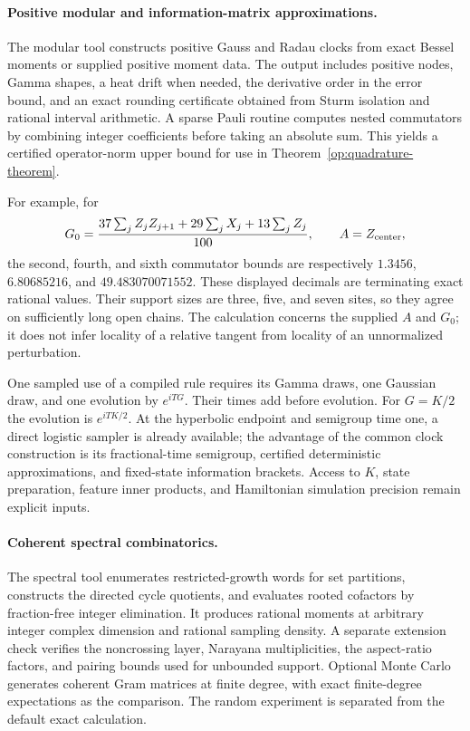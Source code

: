 \paragraph{Positive modular and information-matrix approximations.}
The modular tool constructs positive Gauss and Radau clocks from exact
Bessel moments or supplied positive moment data. The output includes
positive nodes, Gamma shapes, a heat drift when needed, the derivative
order in the error bound, and an exact rounding certificate obtained from
Sturm isolation and rational interval arithmetic. A sparse Pauli routine
computes nested commutators by combining integer coefficients before
taking an absolute sum. This yields a certified operator-norm upper bound
for use in Theorem~\ref{op:quadrature-theorem}.

For example, for
\[
 G_0=\frac{37\sum_jZ_jZ_{j+1}+29\sum_jX_j+13\sum_jZ_j}{100},
 \qquad A=Z_{\rm center},
\]
the second, fourth, and sixth commutator bounds are respectively
$1.3456$, $6.80685216$, and $49.483070071552$. These displayed decimals
are terminating exact rational values. Their support sizes are three,
five, and seven sites, so they agree on sufficiently long open chains.
The calculation concerns the supplied $A$ and $G_0$; it does not infer
locality of a relative tangent from locality of an unnormalized perturbation.

One sampled use of a compiled rule requires its Gamma draws, one Gaussian
draw, and one evolution by $e^{iTG}$. Their times add before evolution.
For $G=K/2$ the evolution is $e^{iTK/2}$. At the hyperbolic endpoint and
semigroup time one, a direct logistic sampler is already available; the
advantage of the common clock construction is its fractional-time
semigroup, certified deterministic approximations, and fixed-state
information brackets. Access to $K$, state preparation, feature inner
products, and Hamiltonian simulation precision remain explicit inputs.

\paragraph{Coherent spectral combinatorics.}
The spectral tool enumerates restricted-growth words for set partitions,
constructs the directed cycle quotients, and evaluates rooted cofactors by
fraction-free integer elimination. It produces rational moments at
arbitrary integer complex dimension and rational sampling density. A
separate extension check verifies the noncrossing layer, Narayana
multiplicities, the aspect-ratio factors, and pairing bounds used for
unbounded support. Optional Monte Carlo generates coherent Gram matrices
at finite degree, with exact finite-degree expectations as the comparison.
The random experiment is separated from the default exact calculation.

